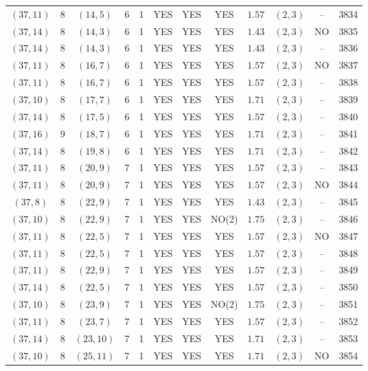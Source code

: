 \begin{longtable}{|c|c|c|c|c|c|c|c|c|c|c|c|}
$(37,11)$ & 8 & $(14,5)$ & 6 & 1 & YES & YES & YES & $1.57$ & $(2,3)$ & -- & 3834\\
$(37,14)$ & 8 & $(14,3)$ & 6 & 1 & YES & YES & YES & $1.43$ & $(2,3)$ & NO & 3835\\
$(37,14)$ & 8 & $(14,3)$ & 6 & 1 & YES & YES & YES & $1.43$ & $(2,3)$ & -- & 3836\\
$(37,11)$ & 8 & $(16,7)$ & 6 & 1 & YES & YES & YES & $1.57$ & $(2,3)$ & NO & 3837\\
$(37,11)$ & 8 & $(16,7)$ & 6 & 1 & YES & YES & YES & $1.57$ & $(2,3)$ & -- & 3838\\
$(37,10)$ & 8 & $(17,7)$ & 6 & 1 & YES & YES & YES & $1.71$ & $(2,3)$ & -- & 3839\\
$(37,14)$ & 8 & $(17,5)$ & 6 & 1 & YES & YES & YES & $1.57$ & $(2,3)$ & -- & 3840\\
$(37,16)$ & 9 & $(18,7)$ & 6 & 1 & YES & YES & YES & $1.71$ & $(2,3)$ & -- & 3841\\
$(37,14)$ & 8 & $(19,8)$ & 6 & 1 & YES & YES & YES & $1.71$ & $(2,3)$ & -- & 3842\\
$(37,11)$ & 8 & $(20,9)$ & 7 & 1 & YES & YES & YES & $1.57$ & $(2,3)$ & -- & 3843\\
$(37,11)$ & 8 & $(20,9)$ & 7 & 1 & YES & YES & YES & $1.57$ & $(2,3)$ & NO & 3844\\
$(37,8)$ & 8 & $(22,9)$ & 7 & 1 & YES & YES & YES & $1.43$ & $(2,3)$ & -- & 3845\\
$(37,10)$ & 8 & $(22,9)$ & 7 & 1 & YES & YES & NO(2) & $1.75$ & $(2,3)$ & -- & 3846\\
$(37,11)$ & 8 & $(22,5)$ & 7 & 1 & YES & YES & YES & $1.57$ & $(2,3)$ & NO & 3847\\
$(37,11)$ & 8 & $(22,5)$ & 7 & 1 & YES & YES & YES & $1.57$ & $(2,3)$ & -- & 3848\\
$(37,11)$ & 8 & $(22,9)$ & 7 & 1 & YES & YES & YES & $1.57$ & $(2,3)$ & -- & 3849\\
$(37,14)$ & 8 & $(22,5)$ & 7 & 1 & YES & YES & YES & $1.57$ & $(2,3)$ & -- & 3850\\
$(37,10)$ & 8 & $(23,9)$ & 7 & 1 & YES & YES & NO(2) & $1.75$ & $(2,3)$ & -- & 3851\\
$(37,11)$ & 8 & $(23,7)$ & 7 & 1 & YES & YES & YES & $1.57$ & $(2,3)$ & -- & 3852\\
$(37,14)$ & 8 & $(23,10)$ & 7 & 1 & YES & YES & YES & $1.71$ & $(2,3)$ & -- & 3853\\
$(37,10)$ & 8 & $(25,11)$ & 7 & 1 & YES & YES & YES & $1.71$ & $(2,3)$ & NO & 3854\\

\end{longtable}
